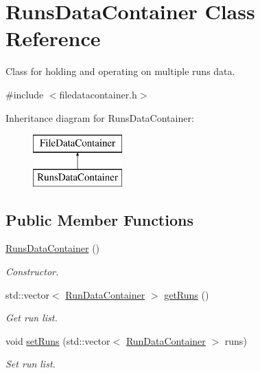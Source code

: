 \hypertarget{classRunsDataContainer}{}\section{Runs\+Data\+Container Class Reference}
\label{classRunsDataContainer}


Class for holding and operating on multiple runs data.  




{\ttfamily \#include $<$filedatacontainer.\+h$>$}

Inheritance diagram for Runs\+Data\+Container\+:\begin{figure}[H]
\begin{center}
\leavevmode
\includegraphics[height=2.000000cm]{classRunsDataContainer}
\end{center}
\end{figure}
\subsection*{Public Member Functions}
\begin{DoxyCompactItemize}
\item 
\mbox{\hyperlink{classRunsDataContainer_a7ed2dea1c915f02f2b44c27e1dabb1a6}{Runs\+Data\+Container}} ()
\begin{DoxyCompactList}\small\item\em Constructor. \end{DoxyCompactList}\item 
std\+::vector$<$ \mbox{\hyperlink{classRunDataContainer}{Run\+Data\+Container}} $>$ \mbox{\hyperlink{classRunsDataContainer_a893ead039b1509b3ae391358bd7d2ce6}{get\+Runs}} ()
\begin{DoxyCompactList}\small\item\em Get run list. \end{DoxyCompactList}\item 
void \mbox{\hyperlink{classRunsDataContainer_a534b4bb8b49cdc4dc2b24521af3b17d8}{set\+Runs}} (std\+::vector$<$ \mbox{\hyperlink{classRunDataContainer}{Run\+Data\+Container}} $>$ runs)
\begin{DoxyCompactList}\small\item\em Set run list. \end{DoxyCompactList}\end{DoxyCompactItemize}


